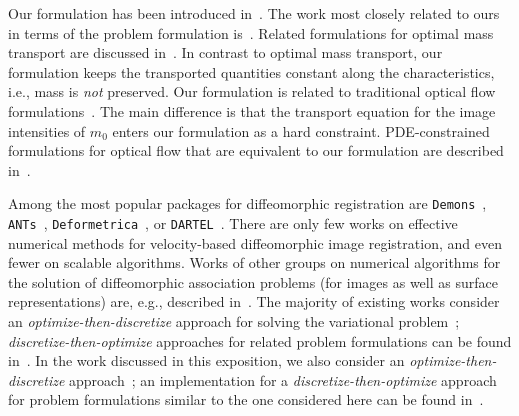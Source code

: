 \documentclass[11pt]{amsart}
\begin{document}
Our formulation has been introduced in~\cite{Mang:2015a,Mang:2016a}. The work most closely related to ours in terms of the problem formulation is~\cite{Borzi:2002a,Borzi:2002b,Chen:2012a,Hart:2009a,Lee:2010a,Lee:2011a,Vialard:2012a,Herzog:2019a}. Related formulations for optimal mass transport are discussed in~\cite{Benzi:2011a,Haber:2015a,Rehman:2009a,Mang:2017a,Herzog:2019a}. In contrast to optimal mass transport, our formulation keeps the transported quantities constant along the characteristics, i.e., mass is \emph{not} preserved. Our formulation is related to traditional optical flow formulations~\cite{Horn:1981a,Kalmoun:2011a,Ruhnau:2007a}. The main difference is that the transport equation for the image intensities of $m_0$ enters our formulation as a hard constraint. PDE-constrained formulations for optical flow that are equivalent to our formulation are described in~\cite{Andreev:2015a,Barbu:2016a,Borzi:2002a,Chen:2011a}.

Among the most popular packages for diffeomorphic registration are {\tt Demons}~\cite{Vercauteren:2008a,Vercauteren:2009a}, {\tt ANTs}~\cite{Avants:2011a,Avants:2008a,}, {\tt Deformetrica}~\cite{Bone:2018a,Fishbaugh:2017a}, or {\tt DARTEL}~\cite{Ashburner:2007a}. There are only few works on effective numerical methods for velocity-based diffeomorphic image registration, and even fewer on scalable algorithms. Works of other groups on numerical algorithms for the solution of diffeomorphic  association problems (for images as well as surface representations) are, e.g., described in~\cite{Beg:2005a,Cao:2005a,Hsieh:2022a,Polzin:2016a,Polzin:2020a,Vialard:2012a,Niethammer:2009a,Hart:2009a,Arguillere:2016a}. The majority of existing works consider an \emph{optimize-then-discretize} approach for solving the variational problem~\cite{Beg:2005a,Arguillere:2016a,Vialard:2012a,Zhang:2015b,Ashburner:2011a,Hart:2009a,Miller:2006a}; \emph{discretize-then-optimize} approaches for related problem formulations can be found in~\cite{Polzin:2020a,Azencott:2010a,Mang:2017a,Zhang:2021a,Mang:2023a}. In the work discussed in this exposition, we also consider an \emph{optimize-then-discretize} approach~\cite{Mang:2015a,Mang:2016a,Mang:2016b}; an implementation for a \emph{discretize-then-optimize} approach for problem formulations similar to the one considered here can be found in~\cite{Mang:2017a}.
\end{document}

